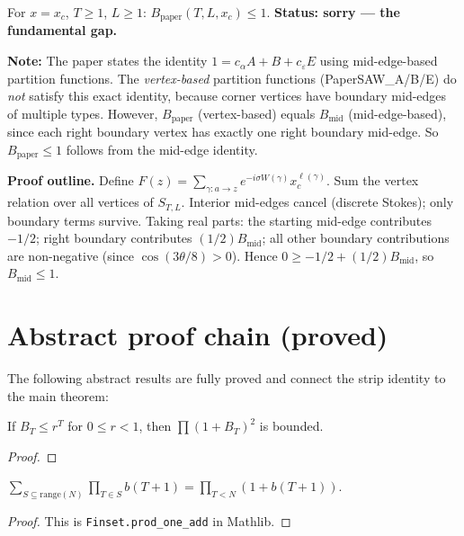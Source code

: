 \begin{theorem}\label{thm:strip_identity_paper}
  For $x = x_c$, $T \geq 1$, $L \geq 1$:
  $B_{\text{paper}}(T, L, x_c) \leq 1$.
  \textbf{Status: sorry --- the fundamental gap.}

  \medskip
  \textbf{Note:} The paper states the identity
  $1 = c_\alpha A + B + c_\varepsilon E$ using mid-edge-based partition
  functions. The \emph{vertex-based} partition functions (PaperSAW\_A/B/E)
  do \emph{not} satisfy this exact identity, because corner vertices have
  boundary mid-edges of multiple types. However, $B_{\text{paper}}$
  (vertex-based) equals $B_{\text{mid}}$ (mid-edge-based), since each
  right boundary vertex has exactly one right boundary mid-edge.
  So $B_{\text{paper}} \leq 1$ follows from the mid-edge identity.

  \medskip
  \textbf{Proof outline.}
  Define $F(z) = \sum_{\gamma : a \to z} e^{-i\sigma W(\gamma)} x_c^{\ell(\gamma)}$.
  Sum the vertex relation over all vertices of $S_{T,L}$.
  Interior mid-edges cancel (discrete Stokes); only boundary terms survive.
  Taking real parts: the starting mid-edge contributes $-1/2$;
  right boundary contributes $(1/2) B_{\text{mid}}$;
  all other boundary contributions are non-negative (since $\cos(3\theta/8) > 0$).
  Hence $0 \geq -1/2 + (1/2) B_{\text{mid}}$, so $B_{\text{mid}} \leq 1$.
\end{theorem}

\section{Abstract proof chain (proved)}

The following abstract results are fully proved and connect
the strip identity to the main theorem:

\begin{theorem}\label{thm:bridge_prod}
\leanok
  If $B_T \leq r^T$ for $0 \leq r < 1$, then $\prod(1 + B_T)^2$ is bounded.
\end{theorem}
\begin{proof}
\leanok
\end{proof}

\begin{theorem}\label{thm:subset_prod}
\leanok
  $\sum_{S \subseteq \text{range}(N)} \prod_{T \in S} b(T+1)
  = \prod_{T < N} (1 + b(T+1))$.
\end{theorem}
\begin{proof}
\leanok
  This is \texttt{Finset.prod\_one\_add} in Mathlib.
\end{proof}

